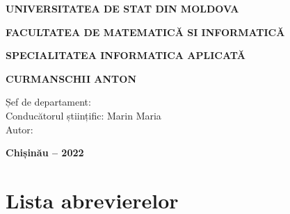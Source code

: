 \documentclass[a4paper,12pt]{report}
\newcommand{\authorName}{Curmanschii Anton}
\begin{document}
\sloppy

\begin{titlepage}
  \vspace*{\fill}
  \begin{center}
      \vspace*{1cm}

      \large
      \uppercase{\textbf{UNIVERSITATEA DE STAT DIN MOLDOVA\\}}

      \normalsize
      \uppercase{\textbf{FACULTATEA DE MATEMATICĂ SI INFORMATICĂ}}
      \vspace{0.1cm}

      \normalsize
      \uppercase{\textbf{SPECIALITATEA INFORMATICA APLICATĂ}}
      \vspace{3.0cm}

      \large
      \textbf{\uppercase\expandafter{\authorName}}
      \vspace{1.5cm}

      \Large
      \textbf{\uppercase\expandafter{\thesisTitle}}
      \vspace{0.75cm}

    \end{center}
  \vfill

  \normalsize
  \begin{flushleft}
    Șef de departament: \\
    Conducătorul științific: Marin Maria \\
    Autor:
  \end{flushleft}

  \begin{center}
    \textbf{Chișinău -- 2022}
  \end{center}

\end{titlepage}

\clearpage
\tableofcontents

\clearpage
\chapter*{Lista abrevierelor}
\begin{acronym}
  \begin{center}
  \end{center}
\end{acronym}
\end{document}
